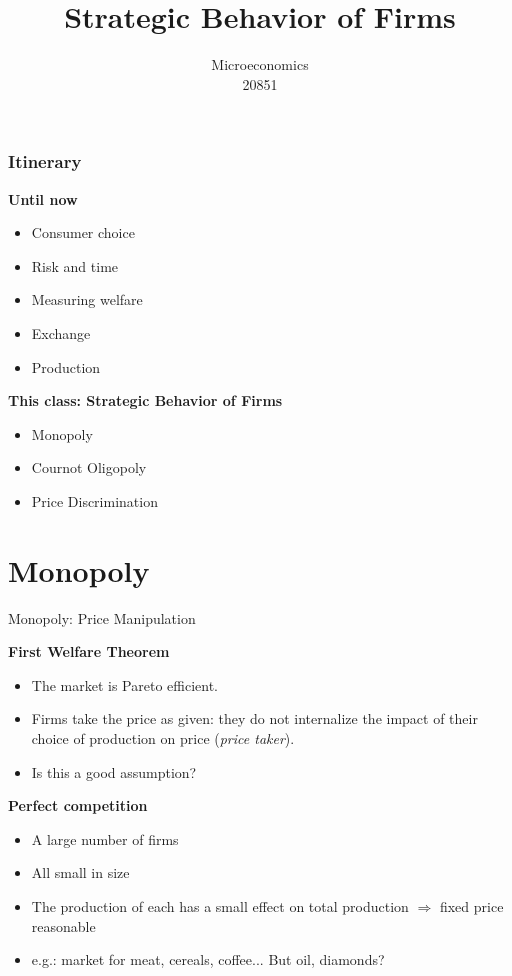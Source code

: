 \documentclass[handout]{beamer}
\title{Strategic Behavior of Firms}
\author{Microeconomics \\ 20851}
\date{}
\newenvironment{iPar}[1]{\textbf{#1} \begin{itemize}}{\end{itemize}}
\newcommand{\mdp}{\medskip \pause}
\begin{document}
\frame{\titlepage}

\begin{frame}\frametitle{Itinerary}

\begin{iPar}{Until now}
\item Consumer choice
\item Risk and time
\item Measuring welfare
\item Exchange
\item Production
\end{iPar}\mdp

\begin{iPar}{This class: Strategic Behavior of Firms}
\item Monopoly
\item Cournot Oligopoly
\item Price Discrimination
\end{iPar}\mdp

\end{frame}

\section[Outline]{}
\frame{\tableofcontents}

\section{Monopoly}

\begin{frame}{Monopoly: Price Manipulation}

\begin{iPar}{First Welfare Theorem} \item The market is Pareto efficient.  \item Firms take the price as given: they do not internalize the impact of their choice of production on price (\textit{price taker}).
\item Is this a good assumption? \end{iPar} \mdp

\begin{iPar}{Perfect competition} \item A large number of firms \item
All small in size \item The production of each has a small effect on total production $\Rightarrow$ fixed price reasonable \item e.g.: market for meat, cereals, coffee... But oil, diamonds? \end{iPar}

\end{frame}
\end{document}
